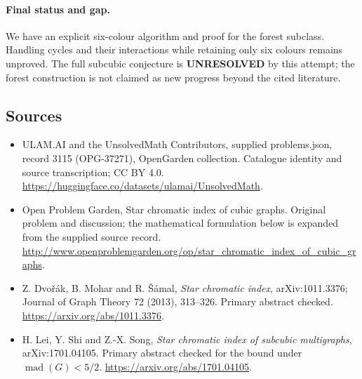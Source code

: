 \documentclass[11pt,a4paper]{article}
\begin{document}
\paragraph{Final status and gap.}
We have an explicit six-colour algorithm and proof for the forest subclass. Handling cycles and their interactions while retaining only six colours remains unproved. The full subcubic conjecture is \textbf{UNRESOLVED} by this attempt; the forest construction is not claimed as new progress beyond the cited literature.

\subsection{Sources}
\begin{itemize}
\item[S1] ULAM.AI and the UnsolvedMath Contributors, supplied problems.json, record 3115 (OPG-37271), OpenGarden collection. Catalogue identity and source transcription; CC BY 4.0.
\url{https://huggingface.co/datasets/ulamai/UnsolvedMath}.
\item[S2] Open Problem Garden, Star chromatic index of cubic graphs. Original problem and discussion; the mathematical formulation below is expanded from the supplied source record.
\url{http://www.openproblemgarden.org/op/star_chromatic_index_of_cubic_graphs}.
\item[R1] Z. Dvořák, B. Mohar and R. Šámal, \emph{Star chromatic index}, arXiv:1011.3376; Journal of Graph Theory 72 (2013), 313--326. Primary abstract checked.
\url{https://arxiv.org/abs/1011.3376}.
\item[R2] H. Lei, Y. Shi and Z.-X. Song, \emph{Star chromatic index of subcubic multigraphs}, arXiv:1701.04105. Primary abstract checked for the bound under $\operatorname{mad}(G)<5/2$.
\url{https://arxiv.org/abs/1701.04105}.
\end{itemize}
\end{document}
